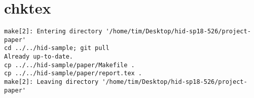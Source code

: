 \appendix
\section{chktex}
\begin{tiny}
\begin{verbatim}
make[2]: Entering directory '/home/tim/Desktop/hid-sp18-526/project-paper'
cd ../../hid-sample; git pull
Already up-to-date.
cp ../../hid-sample/paper/Makefile .
cp ../../hid-sample/paper/report.tex .
make[2]: Leaving directory '/home/tim/Desktop/hid-sp18-526/project-paper'
\end{verbatim}
\end{tiny}
